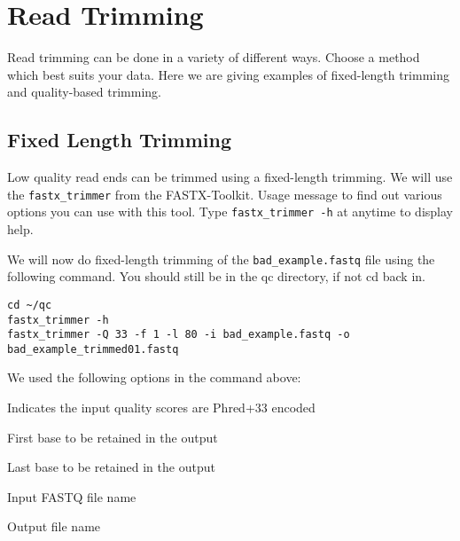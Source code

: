 \section{Read Trimming}
Read trimming can be done in a variety of different ways. Choose a method
which best suits your data. Here we are giving examples of fixed-length trimming
and quality-based trimming.

\subsection{Fixed Length Trimming}
Low quality read ends can be trimmed using a fixed-length trimming. We will use the
\texttt{fastx\_trimmer} from the FASTX-Toolkit. Usage message to find out various options
you can use with this tool. Type \texttt{fastx\_trimmer -h} at anytime to display help.

\begin{steps}
We will now do fixed-length trimming of the \texttt{bad\_example.fastq} file
using the following command. You should still be in the qc directory, if not cd back in.
\begin{lstlisting}
cd ~/qc
fastx_trimmer -h
fastx_trimmer -Q 33 -f 1 -l 80 -i bad_example.fastq -o bad_example_trimmed01.fastq
\end{lstlisting}
\end{steps}

\begin{note}
We used the following options in the command above:
\begin{description}[style=multiline,labelindent=0cm,align=right,leftmargin=\descriptionlabelspace,rightmargin=1.5cm,font=\ttfamily]
 \item[-Q 33] Indicates the input quality scores are Phred+33 encoded
 \item[-f] First base to be retained in the output
 \item[-l] Last base to be retained in the output
 \item[-i] Input FASTQ file name
 \item[-o] Output file name
\end{description}
\end{note}

